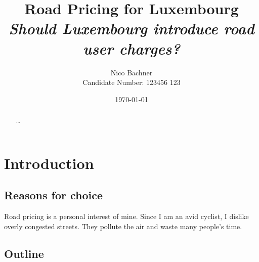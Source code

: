 \documentclass[
      a4paper,
        12pt,
          oneside,
      ]{article}
\title{
    \textbf{Road Pricing for Luxembourg}\\
    \emph{Should Luxembourg introduce road user charges?}
      }
\author{
          Nico Bachner\\
          Candidate Number: 123456 123
        }
\date{\today}
\begin{document}
\maketitle
\thispagestyle{empty}

  \begin{abstract}
    \ldots{}
  \end{abstract}

      \newpage
        \setcounter{tocdepth}{4}
    \tableofcontents
      \newpage
  


\hypertarget{introduction}{%
\section{Introduction}\label{introduction}}

\hypertarget{reasons-for-choice}{%
\subsection{Reasons for choice}\label{reasons-for-choice}}

Road pricing is a personal interest of mine. Since I am an avid cyclist,
I dislike overly congested streets. They pollute the air and waste many
people's time.

\hypertarget{outline}{%
\subsection{Outline}\label{outline}}
\end{document}
